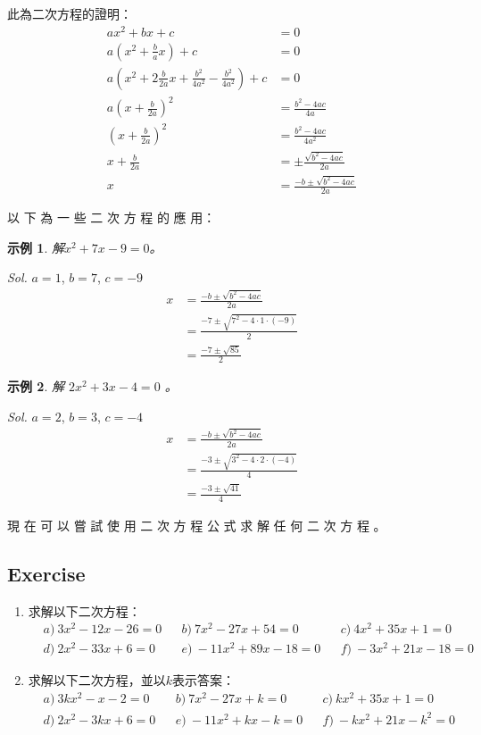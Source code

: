 \documentclass[12pt]{article}
\newtheorem{example}{示例}
\begin{document}
    此為二次方程的證明：\begin{align*}
        ax^2+bx+c&=0\\
        a(x^2+\frac{b}{a}x)+c&=0\\
        a(x^2+2\frac{b}{2a}x+\frac{b^2}{4a^2}-\frac{b^2}{4a^2})+c&=0\\
        a(x+\frac{b}{2a})^2&=\frac{b^2-4ac}{4a}\\
        (x+\frac{b}{2a})^2&=\frac{b^2-4ac}{4a^2}\\
        x+\frac{b}{2a}&=\pm\frac{\sqrt{b^2-4ac}}{2a}\\
        x&=\frac{-b\pm\sqrt{b^2-4ac}}{2a}
    \end{align*}

    以 下 為 一 些 二 次 方 程 的 應 用：

    \begin{example}
        解$x^2+7x-9=0$。
    \end{example}

    \textit{ Sol.} $a=1$, $b=7$, $c=-9$ \begin{align*}
        x&=\frac{-b\pm\sqrt{b^2-4ac}}{2a}\\
        &=\frac{-7\pm\sqrt{7^2-4\cdot 1\cdot (-9)}}{2}\\
        &=\frac{-7\pm\sqrt{85}}{2}
    \end{align*}

    \begin{example}
        解 $2x^2+3x-4=0$ 。
    \end{example}

    \textit{ Sol.}  $a=2$, $b=3$, $c=-4$ \begin{align*}
        x&=\frac{-b\pm\sqrt{b^2-4ac}}{2a}\\
        &=\frac{-3\pm\sqrt{3^2-4\cdot 2\cdot (-4)}}{4}\\
        &=\frac{-3\pm\sqrt{41}}{4}
    \end{align*}

    現 在 可 以 嘗 試 使 用 二 次 方 程 公 式 求 解 任 何 二 次 方 程 。

    \subsection*{Exercise}

    \begin{enumerate}
        \item 求解以下二次方程：\begin{align*}
            &a)\ 3x^2-12x-26=0&&b)\ 7x^2-27x+54=0&&c)\ 4x^2+35x+1=0\\
            &d)\ 2x^2-33x+6=0&&e)\ -11x^2+89x-18=0&&f)\ -3x^2+21x-18=0
        \end{align*}
        \item 求解以下二次方程，並以$k$表示答案：\begin{align*}
            &a)\ 3kx^2-x-2=0&&b)\ 7x^2-27x+k=0&&c)\ kx^2+35x+1=0\\
            &d)\ 2x^2-3kx+6=0&&e)\ -11x^2+kx-k=0&&f)\ -kx^2+21x-k^2=0
        \end{align*}
    \end{enumerate}
\end{document}
